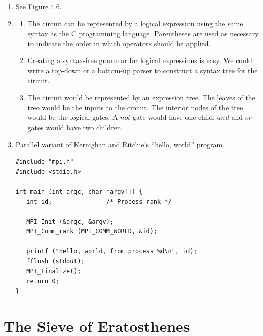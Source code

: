 \begin{enumerate}
\item See Figure 4.6.

\item \begin{enumerate}
      \item The circuit can be represented by a logical expression using
            the same syntax as the C programming language. Parentheses
            are used as necessary to indicate the order in which
            operators should be applied.
      \item Creating a syntax-free grammar for logical expressions is easy.
            We could write a top-down or a bottom-up parser to construct a
            syntax tree for the circuit.
      \item The circuit would be represented by an expression tree. The
            leaves of the tree would be the inputs to the circuit. The
            interior nodes of the tree would be the logical gates. A $not$
            gate would have one child; $and$ and $or$ gates would have
            two children.
      \end{enumerate}

\vfill\eject
\item  Parallel variant of Kernighan and Ritchie's ``hello, world'' program.

\begin{verbatim}
#include "mpi.h"
#include <stdio.h>

int main (int argc, char *argv[]) {
   int id;               /* Process rank */

   MPI_Init (&argc, &argv);
   MPI_Comm_rank (MPI_COMM_WORLD, &id);

   printf ("hello, world, from process %d\n", id);
   fflush (stdout);
   MPI_Finalize();
   return 0;
}
\end{verbatim}

\end{enumerate}

\chapter{The Sieve of Eratosthenes}

